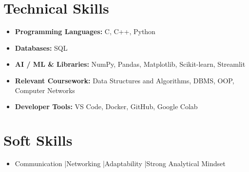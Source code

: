 \documentclass[a4paper,11pt]{article}
\begin{document}
\section*{Technical Skills}

\begin{itemize}
\item \textbf{Programming Languages:} C, C++, Python
\item \textbf{Databases:} SQL
\item \textbf{AI / ML \& Libraries:} NumPy, Pandas, Matplotlib, Scikit-learn, Streamlit
\item \textbf{Relevant Coursework:} Data Structures and Algorithms, DBMS, OOP, Computer Networks
\item \textbf{Developer Tools:} VS Code, Docker, GitHub, Google Colab
\end{itemize}

\section*{Soft Skills}

\begin{itemize}
\item Communication \quad|\quad Networking \quad|\quad Adaptability \quad|\quad Strong Analytical Mindset
\end{itemize}
\end{document}
